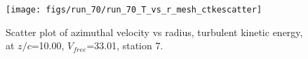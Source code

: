 \begin{figure}[H]
\centering
\texttt{[image: figs/run\_70/run\_70\_T\_vs\_r\_mesh\_ctkescatter]}
\caption{Scatter plot of azimuthal velocity vs radius, turbulent kinetic energy, at $z/c$=10.00, $V_{free}$=33.01, station 7.}
\end{figure}


